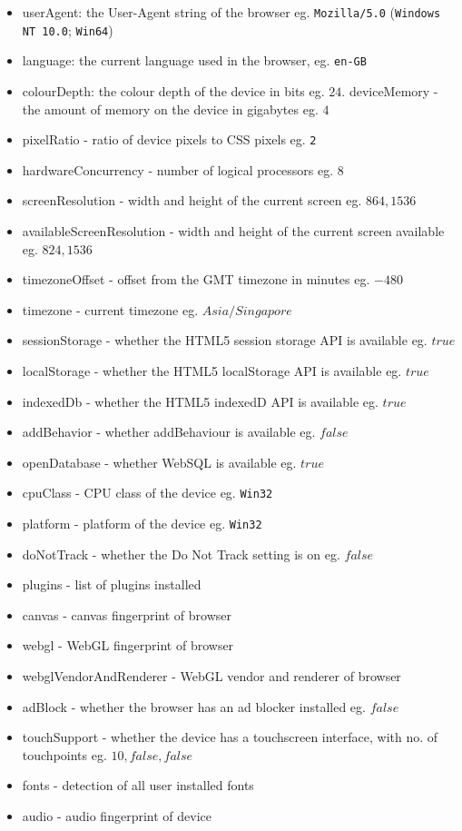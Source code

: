 \documentclass{acm_proc_article-sp}
\begin{document}
\begin{itemize}
    \item userAgent: the User-Agent string of the browser eg. \verb|Mozilla/5.0| (\verb|Windows NT 10.0|; \verb|Win64|)
    \item language: the current language used in the browser, eg. \verb|en-GB|
    \item colourDepth:  the colour depth of the device in bits eg. $24$.
      deviceMemory - the amount of memory on the device in gigabytes eg. $4$
  \item pixelRatio - ratio of device pixels to CSS pixels eg. \verb|2|
  \item hardwareConcurrency - number of logical processors eg. $8$
  \item screenResolution - width and height of the current screen eg. $864,1536$
  \item availableScreenResolution - width and height of the current screen available eg. $824,1536$
  \item  timezoneOffset - offset from the GMT timezone in minutes eg. $-480$
  \item timezone - current timezone eg. $Asia/Singapore$
  \item sessionStorage - whether the HTML5 session storage API is available eg. $true$
  \item localStorage - whether the HTML5 localStorage API is available eg. $true$
  \item indexedDb - whether the HTML5 indexedD API is available eg. $true$
  \item addBehavior - whether addBehaviour is available eg. $false$
  \item openDatabase - whether WebSQL is available eg. $true$
  \item cpuClass - CPU class of the device eg. \verb|Win32|
  \item platform - platform of the device eg. \verb|Win32|
  \item doNotTrack - whether the Do Not Track setting is on eg. $false$
  \item plugins - list of plugins installed
  \item canvas - canvas fingerprint of browser
  \item webgl - WebGL fingerprint of browser
  \item webglVendorAndRenderer - WebGL vendor and renderer of browser
  \item adBlock - whether the browser has an ad blocker installed eg. $false$
  \item touchSupport - whether the device has a touchscreen interface, with no. of touchpoints eg. $10, false,false$
  \item fonts - detection of all user installed fonts
  \item audio - audio fingerprint of device
\end{itemize}
\end{document}

